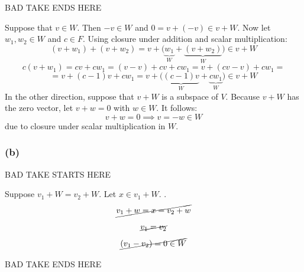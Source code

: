 \documentclass{article}
\begin{document}
\begin{center}
    BAD TAKE ENDS HERE
\end{center}


Suppose that \(v \in W\). Then \(-v \in W\) and \(0 = v + (-v) \in v + W\).
Now let \(w_{1}, w_{2} \in W\) and \(c \in F\). Using closure under addition and scalar multiplication:
\begin{equation*}
    (v + w_{1}) + (v + w_{2}) = v + \Big(\underbrace{w_{1}}_{W} + \underbrace{(v + w_{2})}_{W}\Big) \in v + W
\end{equation*}
\begin{equation*}
    c(v + w_{1}) = cv + cw_{1} = (v - v) + cv + cw_{1} = v + (cv - v) + cw_{1} =
\end{equation*}
\begin{equation*}
    = v + (c-1)v + cw_{1} = v + \Big(\underbrace{(c-1)v}_{W} + \underbrace{cw_{1}}_{W}\Big) \in v + W
\end{equation*}
In the other direction, suppose that \(v + W\) is a subspace of \(V\). Because
\(v + W\) has the zero vector, let \(v + w = 0\) with \(w \in W\). It follows:
\begin{equation*}
    v + w = 0 \implies v = -w \in W
\end{equation*}
due to closure under scalar multiplication in \(W\).



\subsubsection*{(b)}

\begin{center}
    BAD TAKE STARTS HERE
\end{center}

Suppose \(v_{1} + W = v_{2} + W\). Let \(x \in v_{1} + W\). 
. 
\begin{equation*}
    \cancel{v_{1} + w = x = v_{2} + w}
\end{equation*}
\begin{equation*}
    \cancel{v_{1} = v_{2}}
\end{equation*}
\begin{equation*}
    \cancel{(v_{1} - v_{2}) = 0 \in W}
\end{equation*}

\begin{center}
    BAD TAKE ENDS HERE
\end{center}
\end{document}
